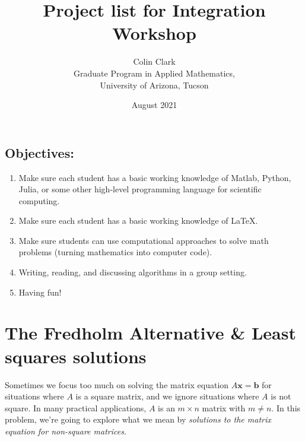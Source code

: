 \documentclass[11pt,oneside]{article}
\title{ Project list for Integration Workshop}
\author{Colin Clark \\  Graduate Program in Applied Mathematics,\\ University of Arizona, Tucson}
\date{August 2021}
\theoremstyle{definition}
\theoremstyle{definition}
\theoremstyle{remark}
\numberwithin{equation}{section}
\begin{document}
\maketitle


\subsection*{Objectives:}
\begin{enumerate}
\item Make sure each student has a basic working knowledge of Matlab, Python, Julia, or some other high-level programming language for scientific computing.
\item Make sure each student has a basic working knowledge of \LaTeX.
\item Make sure students can use computational approaches to solve math problems (turning mathematics into computer code).
\item Writing, reading, and discussing algorithms in a group setting.
\item Having fun!
\end{enumerate}

\newpage

\section{The Fredholm Alternative \& Least squares solutions}
Sometimes we focus too much on solving the matrix equation $A \bm{x} = \bm{b}$ for situations where $A$ is a square matrix,  and we ignore situations where $A$ is not square. In many practical applications,  $A$ is an $m \times n$ matrix with $m \neq n$. In this problem, we're going to explore what we mean by \textit{solutions to the matrix equation for non-square matrices}.
\end{document}
